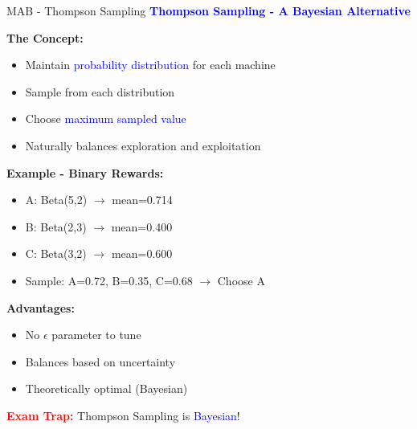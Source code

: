 \documentclass[8pt]{beamer}
\begin{document}
	\begin{frame}{MAB - Thompson Sampling}
		\fontsize{6.5}{7.5}\selectfont
		\textcolor{blue}{\textbf{Thompson Sampling - A Bayesian Alternative}}
		
		\textbf{The Concept:}
		\begin{itemize}
			\item Maintain \textcolor{blue}{probability distribution} for each machine
			\item Sample from each distribution
			\item Choose \textcolor{blue}{maximum sampled value}
			\item Naturally balances exploration and exploitation
		\end{itemize}
		
		\textbf{Example - Binary Rewards:}
		\begin{itemize}
			\item A: Beta(5,2) $\rightarrow$ mean=0.714
			\item B: Beta(2,3) $\rightarrow$ mean=0.400
			\item C: Beta(3,2) $\rightarrow$ mean=0.600
			\item Sample: A=0.72, B=0.35, C=0.68 $\rightarrow$ Choose A
		\end{itemize}
		
		\textbf{Advantages:}
		\begin{itemize}
			\item No $\epsilon$ parameter to tune
			\item Balances based on uncertainty
			\item Theoretically optimal (Bayesian)
		\end{itemize}
		
		\textcolor{red}{\textbf{Exam Trap:}} Thompson Sampling is \textcolor{blue}{Bayesian}!
	\end{frame}
	
\end{document}
